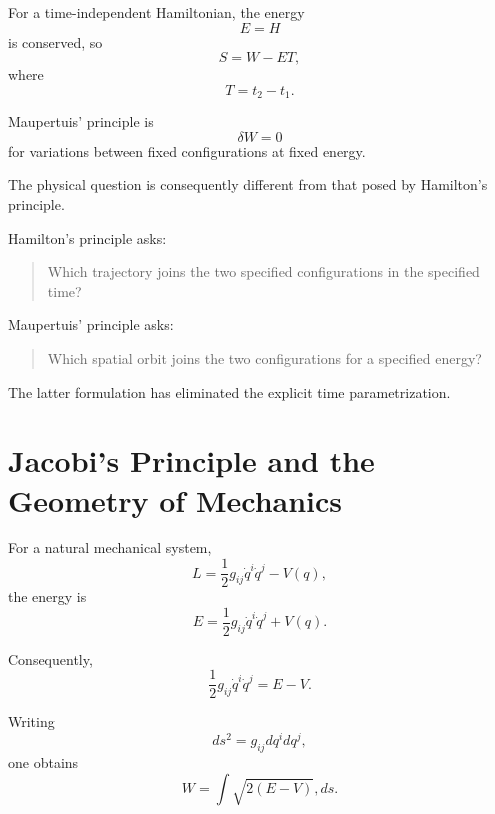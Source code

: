 For a time-independent Hamiltonian, the energy
\begin{equation}
E=H
\end{equation}
is conserved, so
\begin{equation}
\boxed{
S=W-E T,
}
\label{eq:S-W-ET}
\end{equation}
where
\begin{equation}
T=t_2-t_1.
\end{equation}

Maupertuis' principle is
\begin{equation}
\boxed{
\delta W=0
}
\label{eq:maupertuis}
\end{equation}
for variations between fixed configurations at fixed energy.

The physical question is consequently different from that posed by Hamilton's principle.

Hamilton's principle asks:

\begin{quote}
Which trajectory joins the two specified configurations in the specified time?
\end{quote}

Maupertuis' principle asks:

\begin{quote}
Which spatial orbit joins the two configurations for a specified energy?
\end{quote}

The latter formulation has eliminated the explicit time parametrization.

\section{Jacobi's Principle and the Geometry of Mechanics}

For a natural mechanical system,
\begin{equation}
L
=
\frac12g_{ij}\dot q^i\dot q^j-V(q),
\end{equation}
the energy is
\begin{equation}
E
=
\frac12g_{ij}\dot q^i\dot q^j+V(q).
\end{equation}

Consequently,
\begin{equation}
\frac12g_{ij}\dot q^i\dot q^j
=
E-V.
\end{equation}

Writing
\begin{equation}
ds^2=g_{ij}dq^i dq^j,
\end{equation}
one obtains
\begin{equation}
W
=
\int
\sqrt{2(E-V)},ds.
\end{equation}

